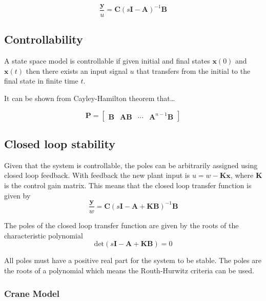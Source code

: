 \documentclass{article}
\begin{document}
\begin{equation} 
  \frac{\mathbf{y}}{u} = \mathbf{C} (s\mathbf{I} - \mathbf{A}) ^{-1} \mathbf{B}
\end{equation}

\subsection{Controllability}


A state space model is controllable if given initial and final states $\mathbf{x}(0)$ and $\mathbf{x}(t)$
then there exists an input signal $u$ that transfers from the initial to the final state in finite time $t$.

It can be shown from Cayley-Hamilton theorem that\dots 

\begin{equation}
  \mathbf{P} = \begin{bmatrix}
    \mathbf{B} & \mathbf{AB} & \cdots & \mathbf{A}^{n-1}\mathbf{B}
  \end{bmatrix}
\end{equation}

\subsection{Closed loop stability}
Given that the system is controllable, the poles can be arbitrarily assigned using closed loop feedback.
With feedback the new plant input is $u = w - \mathbf{Kx}$, where $\mathbf{K}$ is the control gain matrix.
This means that the closed loop transfer function is given by
\begin{equation}
  \frac{\mathbf{y}}{w} = \mathbf{C} (s\mathbf{I} - \mathbf{A} + \mathbf{KB}) ^{-1} \mathbf{B}
\end{equation}

The poles of the closed loop transfer function are given by the roots of the characteristic polynomial
\begin{equation}
  \text{det} \left( s\mathbf{I} - \mathbf{A} + \mathbf{KB} \right) = 0
\end{equation}

All poles must have a positive real part for the system to be stable.
The poles are the roots of a polynomial which means the Routh-Hurwitz criteria can be used.

\subsubsection{Crane Model}
\end{document}
